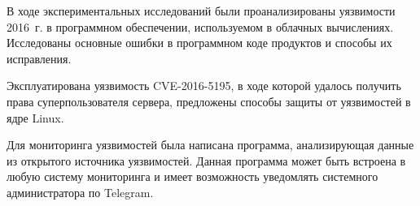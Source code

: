 В ходе экспериментальных исследований были проанализированы уязвимости 2016~г. в программном обеспечении, используемом в облачных вычислениях.
Исследованы основные ошибки в программном коде продуктов и способы их исправления.

Эксплуатирована уязвимость CVE-2016-5195, в ходе которой удалось получить права суперпользователя сервера, предложены способы защиты от уязвимостей в ядре Linux.

Для мониторинга уязвимостей была написана программа, анализирующая данные из открытого источника уязвимостей.
Данная программа может быть встроена в любую систему мониторинга и имеет возможность уведомлять системного администратора по Telegram.

\clearpage
